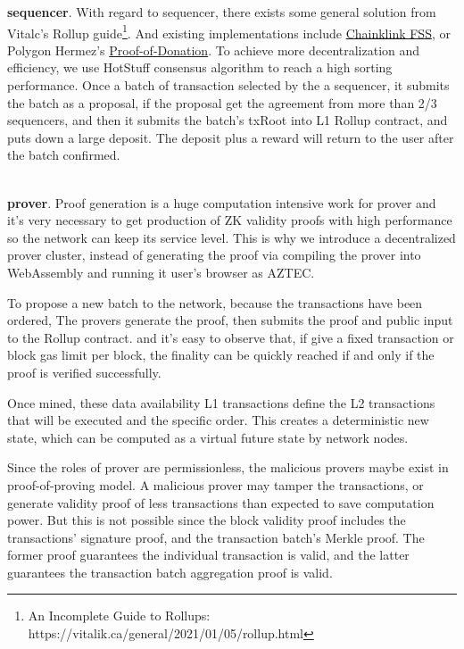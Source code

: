 \documentclass{article}
\begin{document}
\noindent\textbf{sequencer}. With regard to sequencer, there exists some general solution from Vitalc's Rollup guide\footnote{An Incomplete Guide to Rollups: https://vitalik.ca/general/2021/01/05/rollup.html}. And existing implementations include \href{https://blog.chain.link/chainlink-fair-sequencing-services-enabling-a-provably-fair-defi-ecosystem/}{Chainklink FSS}, or Polygon Hermez's \href{https://blog.hermez.io/introducing-proof-of-donation/}{Proof-of-Donation}. To achieve more decentralization and efficiency, we use HotStuff \cite{yin2018hotstuff} consensus algorithm to reach a high sorting performance.  Once a batch of transaction selected by the a sequencer, it submits the batch as a proposal, if the proposal get the agreement from more than 2/3 sequencers, and then it submits the batch's txRoot into L1 Rollup contract, and puts down a large deposit. The deposit plus a reward will return to the user after the batch confirmed.

~\\
\noindent\textbf{prover}. Proof generation is a huge computation intensive work for prover and it's very necessary to get production of ZK validity proofs with high performance so the network can keep its service level. This is why we introduce a decentralized prover cluster, instead of generating the proof via compiling the prover into WebAssembly and running it user's browser as AZTEC.

To propose a new batch to the network, because the transactions have been ordered, The provers generate the proof, then submits the proof and public input to the Rollup contract. and it's easy to observe that, if give a fixed transaction or block gas limit per block, the finality can be quickly reached if and only if the proof is verified successfully.

Once mined, these data availability L1 transactions define the L2 transactions that will be executed and the specific order. This creates a deterministic new state, which can be computed as a virtual future state by network nodes.

Since the roles of prover are permissionless, the malicious provers maybe exist in proof-of-proving model. A malicious prover may tamper the transactions, or generate validity proof of less transactions than expected to save computation power. But this is not possible  since the block validity proof includes the transactions' signature proof, and the transaction batch's Merkle proof. The former proof guarantees the individual transaction is valid, and the latter guarantees the transaction batch aggregation proof is valid. 
\end{document}
